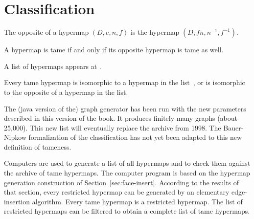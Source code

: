 \section{Classification}
    \label{sec:proof-classification}

\label{sec:classification}




\begin{definition}[opposite] The opposite of a hypermap $(D,e,n,f)$ is the
hypermap $(D,f n,n^{-1},f^{-1})$.
%
\end{definition}

\begin{lemma}
A hypermap is tame if and only if its opposite hypermap is tame as well.
\end{lemma}

A list of hypermaps appears at \cite{website:Hales:1998:Code}.

\begin{theorem}
\label{theorem:classification} Every tame hypermap is isomorphic to
a hypermap in the list~\cite{website:Hales:1998:Code}, or is isomorphic to the opposite of a
hypermap in the list.
%
\end{theorem}

\begin{note}%
The (java version of the) graph generator has been run with the new parameters described in this version of the book.  It produces finitely many graphs (about 25,000).  This new list will eventually replace the archive from 1998.  The Bauer-Nipkow formalization of the classification has not yet been adapted to this new definition of tameness.
%
\end{note}


Computers are used to generate a list of all hypermaps and to check
them against the archive of tame hypermaps.  The computer program is
based on the hypermap generation construction of Section~\ref{sec:face-insert}.  According
to the results of that section, every restricted hypermap can be generated by an
elementary edge-insertion algorithm.  Every tame hypermap is a restricted hypermap.
The list of restricted hypermaps can be filtered to obtain a complete list of tame hypermaps.
%

